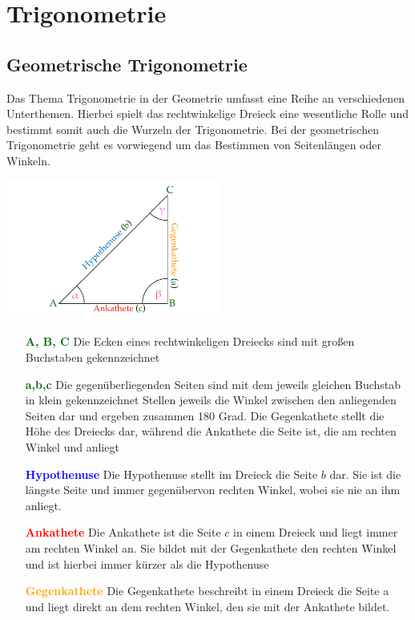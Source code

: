 \newpage
\section{Trigonometrie}\label{sec:Trigonometrie}
	\subsection{Geometrische Trigonometrie}\label{sec:Trigonometrie/Geometrische Trigonometrie}
	Das Thema Trigonometrie in der Geometrie umfasst eine Reihe an verschiedenen Unterthemen. Hierbei
spielt das rechtwinkelige Dreieck eine wesentliche Rolle und bestimmt somit auch die Wurzeln der
Trigonometrie. Bei der geometrischen Trigonometrie geht es vorwiegend um das Bestimmen von
Seitenlängen oder Winkeln.
\begin{center}
	\includegraphics[width=200pt, height=130pt]{Media/Dreieck}
\end{center}
\begin{itemize}
	\item[\textcolor{darkgreen}{\textbf{A, B, C}}]{}
	Die Ecken eines rechtwinkeligen Dreiecks sind mit großen Buchstaben gekennzeichnet
	
	\item[\textcolor{darkgreen}{\textbf{a,b,c}}]{Die gegenüberliegenden Seiten sind mit dem jeweils
	gleichen Buchstab in klein gekennzeichnet
	Stellen jeweils die Winkel zwischen den anliegenden Seiten dar und ergeben zusammen 180 Grad.
	Die Gegenkathete stellt die Höhe
	des Dreiecks dar, während die Ankathete die Seite ist, die am rechten Winkel  und  anliegt}
	
	
	\item[\textcolor{blue}{\textbf{Hypothenuse}}]{}
	Die Hypothenuse stellt im Dreieck die Seite $b$ dar. Sie ist die längste Seite und immer
	gegenübervon rechten Winkel, wobei sie nie an ihm anliegt. 


	\item[\textcolor{red}{\textbf{Ankathete}}]{}
	Die Ankathete ist die Seite $c$ in einem Dreieck und liegt immer am rechten Winkel an. Sie bildet mit der Gegenkathete den rechten Winkel und ist hierbei immer kürzer als die Hypothenuse
	
	
	\item[\textcolor{orange}{\textbf{Gegenkathete}}]{}
	Die Gegenkathete beschreibt in einem Dreieck die Seite a und liegt direkt an dem rechten Winkel,
	den sie mit der Ankathete bildet. 
\end{itemize}
\pagebreak

